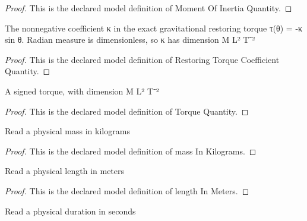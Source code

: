 \begin{proof}
  This is the declared model definition of Moment Of Inertia Quantity.
\end{proof}
\begin{definition}
  \label{def:physics:phyx-mini-0262:phyxminiproblems-problemphyxmini0262-restoringtorquecoefficientquantity}
  The nonnegative coefficient κ in the exact gravitational restoring torque τ(θ) = -κ sin θ. Radian measure is dimensionless, so κ has dimension M L² T⁻²
\end{definition}
\begin{proof}
  This is the declared model definition of Restoring Torque Coefficient Quantity.
\end{proof}
\begin{definition}
  \label{def:physics:phyx-mini-0262:phyxminiproblems-problemphyxmini0262-torquequantity}
  A signed torque, with dimension M L² T⁻²
\end{definition}
\begin{proof}
  This is the declared model definition of Torque Quantity.
\end{proof}
\begin{definition}
  \label{def:physics:phyx-mini-0262:phyxminiproblems-problemphyxmini0262-massinkilograms}
  Read a physical mass in kilograms
\end{definition}
\begin{proof}
  This is the declared model definition of mass In Kilograms.
\end{proof}
\begin{definition}
  \label{def:physics:phyx-mini-0262:phyxminiproblems-problemphyxmini0262-lengthinmeters}
  Read a physical length in meters
\end{definition}
\begin{proof}
  This is the declared model definition of length In Meters.
\end{proof}
\begin{definition}
  \label{def:physics:phyx-mini-0262:phyxminiproblems-problemphyxmini0262-timeinseconds}
  Read a physical duration in seconds
\end{definition}
